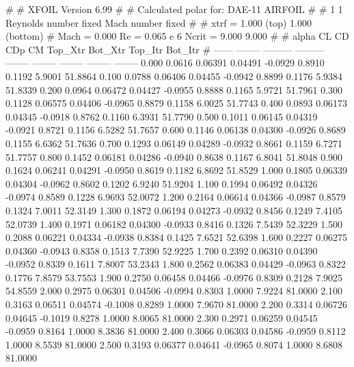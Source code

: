 #  
#       XFOIL         Version 6.99
#  
# Calculated polar for: DAE-11 AIRFOIL                                  
#  
# 1 1 Reynolds number fixed          Mach number fixed         
#  
# xtrf =   1.000 (top)        1.000 (bottom)  
# Mach =   0.000     Re =     0.065 e 6     Ncrit =   9.000  9.000
#  
#   alpha    CL        CD       CDp       CM     Top_Xtr  Bot_Xtr  Top_Itr  Bot_Itr
#  ------ -------- --------- --------- -------- -------- -------- -------- --------
   0.000   0.0616   0.06391   0.04491  -0.0929   0.8910   0.1192   5.9001  51.8864
   0.100   0.0788   0.06406   0.04455  -0.0942   0.8899   0.1176   5.9384  51.8339
   0.200   0.0964   0.06472   0.04427  -0.0955   0.8888   0.1165   5.9721  51.7961
   0.300   0.1128   0.06575   0.04406  -0.0965   0.8879   0.1158   6.0025  51.7743
   0.400   0.0893   0.06173   0.04345  -0.0918   0.8762   0.1160   6.3931  51.7790
   0.500   0.1011   0.06145   0.04319  -0.0921   0.8721   0.1156   6.5282  51.7657
   0.600   0.1146   0.06138   0.04300  -0.0926   0.8689   0.1155   6.6362  51.7636
   0.700   0.1293   0.06149   0.04289  -0.0932   0.8661   0.1159   6.7271  51.7757
   0.800   0.1452   0.06181   0.04286  -0.0940   0.8638   0.1167   6.8041  51.8048
   0.900   0.1624   0.06241   0.04291  -0.0950   0.8619   0.1182   6.8692  51.8529
   1.000   0.1805   0.06339   0.04304  -0.0962   0.8602   0.1202   6.9240  51.9204
   1.100   0.1994   0.06492   0.04326  -0.0974   0.8589   0.1228   6.9693  52.0072
   1.200   0.2164   0.06614   0.04366  -0.0987   0.8579   0.1324   7.0011  52.3149
   1.300   0.1872   0.06194   0.04273  -0.0932   0.8456   0.1249   7.4105  52.0739
   1.400   0.1971   0.06182   0.04300  -0.0933   0.8416   0.1326   7.5439  52.3229
   1.500   0.2088   0.06221   0.04334  -0.0938   0.8384   0.1425   7.6521  52.6398
   1.600   0.2227   0.06275   0.04360  -0.0943   0.8358   0.1513   7.7390  52.9225
   1.700   0.2392   0.06310   0.04390  -0.0952   0.8339   0.1611   7.8007  53.2343
   1.800   0.2562   0.06383   0.04429  -0.0963   0.8322   0.1776   7.8579  53.7553
   1.900   0.2750   0.06458   0.04466  -0.0976   0.8309   0.2128   7.9025  54.8559
   2.000   0.2975   0.06301   0.04506  -0.0994   0.8303   1.0000   7.9224  81.0000
   2.100   0.3163   0.06511   0.04574  -0.1008   0.8289   1.0000   7.9670  81.0000
   2.200   0.3314   0.06726   0.04645  -0.1019   0.8278   1.0000   8.0065  81.0000
   2.300   0.2971   0.06259   0.04545  -0.0959   0.8164   1.0000   8.3836  81.0000
   2.400   0.3066   0.06303   0.04586  -0.0959   0.8112   1.0000   8.5539  81.0000
   2.500   0.3193   0.06377   0.04641  -0.0965   0.8074   1.0000   8.6808  81.0000
